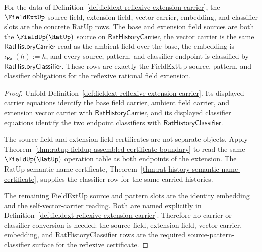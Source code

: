 \begin{theorem}
\label{thm:fieldext-reflexive-source-pattern-classifier-obligations}
For the data of Definition~\ref{def:fieldext-reflexive-extension-carrier}, the
$\FieldExtUp$ source field, extension field, vector carrier, embedding, and
classifier slots are the concrete RatUp rows. The base and extension field
sources are both the $\FieldUp(\RatUp)$ source on
$\mathsf{RatHistoryCarrier}$, the vector carrier is the same
$\mathsf{RatHistoryCarrier}$ read as the ambient field over the base, the
embedding is $\iota_{\mathsf{Rat}}(h):=h$, and every source, pattern, and
classifier endpoint is classified by $\mathsf{RatHistoryClassifier}$. These
rows are exactly the FieldExtUp source, pattern, and classifier obligations for
the reflexive rational field extension.
\end{theorem}
\begin{proof}
Unfold Definition~\ref{def:fieldext-reflexive-extension-carrier}. Its displayed
carrier equations identify the base field carrier, ambient field carrier, and
extension vector carrier with $\mathsf{RatHistoryCarrier}$, and its displayed
classifier equations identify the two endpoint classifiers with
$\mathsf{RatHistoryClassifier}$.

The source field and extension field certificates are not separate objects.
Apply Theorem~\ref{thm:ratup-fieldup-assembled-certificate-boundary} to read the
same $\FieldUp(\RatUp)$ operation table as both endpoints of the extension. The
RatUp semantic name certificate,
Theorem~\ref{thm:rat-history-semantic-name-certificate}, supplies the classifier
row for the same carried histories.

The remaining FieldExtUp source and pattern slots are the identity embedding
and the self-vector-carrier reading. Both are named explicitly in
Definition~\ref{def:fieldext-reflexive-extension-carrier}. Therefore no carrier
or classifier conversion is needed: the source field, extension field, vector
carrier, embedding, and RatHistoryClassifier rows are the required
source-pattern-classifier surface for the reflexive certificate.
\end{proof}

